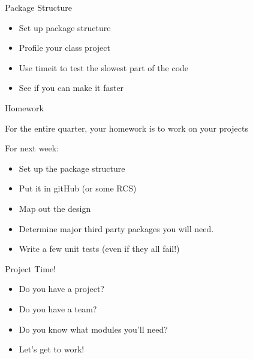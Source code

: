 \documentclass{beamer}
\begin{document}
\begin{frame}[fragile]{Next Week:}

\vfill
{\LARGE The python debugger pdb

\vfill
{\Large  -- Jeff}

\vfill
{\Large And of course, your projects...}

\vfill

\end{frame}

\begin{frame}[fragile]{Package Structure}

\begin{itemize}
    \item Set up package structure
    \item Profile your class project
    \item Use timeit to test the slowest part of the code
    \item See if you can make it faster
\end{itemize}

\end{frame}

\begin{frame}[fragile]{Homework}

For the entire quarter, your homework is to work on your projects

For next week:

\begin{itemize}
    \item Set up the package structure
    \item Put it in gitHub (or some RCS)
    \item Map out the design
    \item Determine major third party packages you will need.
    \item Write a few unit tests (even if they all fail!)
\end{itemize}

\end{frame}

\begin{frame}[fragile]{Project Time!}

\begin{itemize}
    \item Do you have a project? 
    \item Do you have a team?
    \item Do you know what modules you'll need?
    \item Let's get to work!
\end{itemize}

\end{frame}
\end{document}
